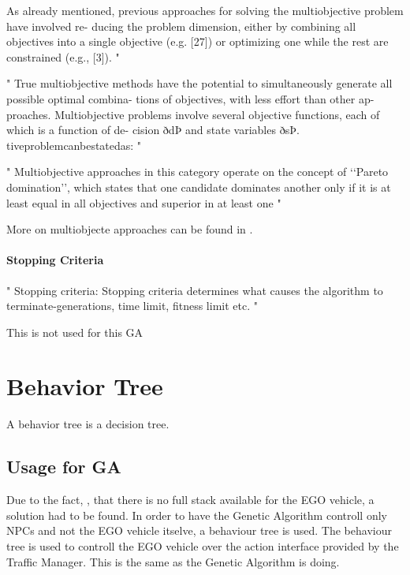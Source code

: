 As already mentioned, previous approaches for solving the multiobjective problem have involved re- ducing the problem dimension, either by combining all objectives into a single objective (e.g. [27]) or optimizing one while the rest are constrained (e.g., [3]).
"\cite{erickson_multi-objective_2002}

"
True multiobjective methods have the potential to simultaneously generate all possible optimal combina- tions of objectives, with less effort than other ap- proaches. Multiobjective problems involve several objective functions, each of which is a function of de- cision ðdÞ and state variables ðsÞ. tiveproblemcanbestatedas:
"\cite{erickson_multi-objective_2002}

"
Multiobjective approaches in this category operate on the concept of ‘‘Pareto domination’’, which states that one candidate dominates another only if it is at least equal in all objectives and superior in at least one
"\cite{erickson_multi-objective_2002}


More on multiobjecte approaches can be found in \cite{erickson_multi-objective_2002}.

\paragraph{Stopping Criteria}

"
Stopping criteria: Stopping criteria determines what causes the algorithm to terminate-generations, time limit, fitness limit etc.
"\cite{majumdar_genetic_2015}

This is not used for this GA


\section{Behavior Tree}
A behavior tree is a decision tree. 

\subsection{Usage for GA}
Due to the fact, , that there is no full stack available for the EGO vehicle, a solution had to be found.
In order to have the Genetic Algorithm controll only NPCs and not the EGO vehicle itselve, a behaviour tree is used.
The behaviour tree is used to controll the EGO vehicle over the action interface provided by the Traffic Manager. This is the same as the Genetic Algorithm is doing.


